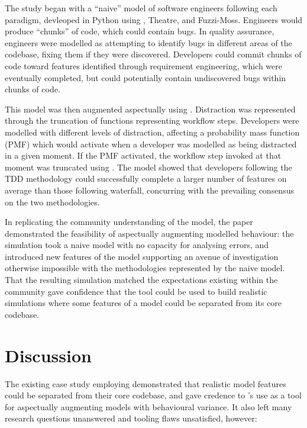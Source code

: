 The study began with a ``naive'' model of software engineers following each
paradigm, devleoped in Python using \pdsf, Theatre, and Fuzzi-Moss. Engineers
would produce ``chunks'' of code, which could contain bugs. In quality
assurance, engineers were modelled as attempting to identify bugs in different
areas of the codebase, fixing them if they were discovered. Developers could
commit chunks of code toward features identified through requirement
engineering, which were eventually completed, but could potentially contain
undiscovered bugs within chunks of code.

This model was then augmented aspectually using \pdsf. Distraction was
represented through the truncation of functions representing workflow steps.
Developers were modelled with different levels of distraction, affecting a
probability mass function (PMF) which would activate when a developer was
modelled as being distracted in a given moment. If the PMF activated, the
workflow step invoked at that moment was truncated using \pdsf. The model showed
that developers following the TDD methodology could successfully complete a
larger number of features on average than those following waterfall, concurring
with the prevailing consensus on the two methodologies.

In replicating the community understanding of the model, the paper demonstrated
the feasibility of aspectually augmenting modelled behaviour: the simulation
took a naive model with no capacity for analysing errors, and introduced new
features of the model supporting an avenue of investigation otherwise
impossible with the methodologies represented by the naive model. That the
resulting simulation matched the expectations existing within the community gave
confidence that the tool could be used to build realistic simulations where
some features of a model could be separated from its core codebase.

\section{Discussion}\label{sec:prior_work_discussion}

The existing case study employing \pdsf demonstrated that realistic model
features could be separated from their core codebase, and gave credence to
\pdsf{}'s use as a tool for aspectually augmenting models with behavioural
variance. It also left many research questions unanswered and tooling
flaws unsatisfied, however:

